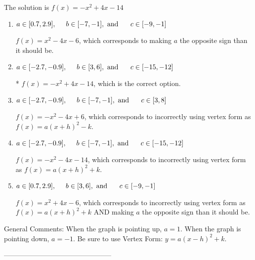 \documentclass{article}[14pt]
\begin{document}
The solution is $ f(x) = -x^{2} +4 x -14 $ 

\begin{enumerate}[label=\Alph*.] 
\item $ a \in [0.7, 2.9], \hspace*{5mm} b \in [-7, -1], \text{ and } \hspace*{5mm} c \in [-9, -1] $ 

 $f(x)=x^{2} -4 x -6$, which corresponds to making $a$ the opposite sign than it should be. 
\item $ a \in [-2.7, -0.9], \hspace*{5mm} b \in [3, 6], \text{ and } \hspace*{5mm} c \in [-15, -12] $ 

 * $f(x)=-x^{2} +4 x -14$, which is the correct option. 
\item $ a \in [-2.7, -0.9], \hspace*{5mm} b \in [-7, -1], \text{ and } \hspace*{5mm} c \in [3, 8] $ 

 $f(x)=-x^{2} -4 x + 6$, which corresponds to incorrectly using vertex form as $f(x) = a(x+h)^2 - k$. 
\item $ a \in [-2.7, -0.9], \hspace*{5mm} b \in [-7, -1], \text{ and } \hspace*{5mm} c \in [-15, -12] $ 

 $f(x)=-x^{2} -4 x -14$, which corresponds to incorrectly using vertex form as $f(x) = a(x+h)^2+k$. 
\item $ a \in [0.7, 2.9], \hspace*{5mm} b \in [3, 6], \text{ and } \hspace*{5mm} c \in [-9, -1] $ 

 $f(x)=x^{2} +4 x -6$, which corresponds to incorrectly using vertex form as $f(x) = a(x+h)^2+k$ AND making $a$ the opposite sign than it should be. 
\end{enumerate} 
 
General Comments: When the graph is pointing up, $a=1$. When the graph is pointing down, $a=-1$. Be sure to use Vertex Form: $y = a(x-h)^2+k$.

-----------------------------------------------
\end{document}
